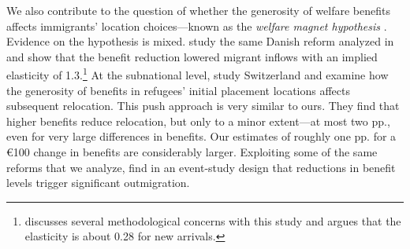 We also contribute to the question of whether the generosity of welfare benefits affects immigrants’ location choices—known as the \textit{welfare magnet hypothesis} \citep{borjas1999}. Evidence on the hypothesis is mixed. \citet{agersnap_welfare_2020} study the same Danish reform analyzed in \citet{dustmann2024} and show that the benefit reduction lowered migrant inflows with an implied elasticity of 1.3.\footnote{\citet{adema2025} discusses several methodological concerns with this study and argues that the elasticity is about 0.28 for new arrivals.} At the subnational level, \citet{ferwerda2023} study Switzerland and examine how the generosity of benefits in refugees’ initial placement locations affects subsequent relocation. This push approach is very similar to ours. They find that higher benefits reduce relocation, but only to a minor extent—at most two pp., even for very large differences in benefits. Our estimates of roughly one pp. for a €100 change in benefits are considerably larger. Exploiting some of the same reforms that we analyze, \citet{huber_impact_2022} find in an event-study design that reductions in benefit levels trigger significant outmigration. 




